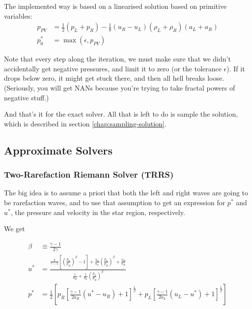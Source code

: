 The implemented way is based on a linearised solution based on primitive variables:
\begin{align*}
	p_{PV} &= \frac{1}{2} (p_L + p_R) - \frac{1}{8} (u_R - u_L)(\rho_L + \rho_R)(a_L + a_R)\\
	p_0^* &= \max(\epsilon, p_{PV})
\end{align*}

Note that every step along the iteration, we must make sure that we didn't accidentally get negative pressures, and limit it to zero (or the tolerance $\epsilon$). 
If it drops below zero, it might get stuck there, and then all hell breaks loose.
(Seriously, you will get NANs because you're trying to take fractal powers of negative stuff.)


And that's it for the exact solver.
All that is left to do is sample the solution, which is described in section \ref{chap:sampling-solution}.






\subsection{Approximate Solvers}



\subsubsection{Two-Rarefaction Riemann Solver (TRRS)}





The big idea is to assume a priori that both the left and right waves are going to be rarefaction waves, and to use that assumption to get an expression for $p^*$ and $u^*$, the pressure and velocity in the star region, respectively.

We get

\begin{align}
	\beta &\equiv 
		\frac{\gamma - 1}{2 \gamma} \\
	u^* &= 
		\frac{
			\frac{2}{\gamma - 1} \left[\left(\frac{p_L}{p_R} \right) ^ \beta - 1\right]+ \frac{u_L}{a_L} \left(\frac{p_L}{p_R} \right) ^ \beta  + \frac{u_R}{a_R}
		}{
			\frac{1}{a_R} + \frac{1}{a_L}\left(\frac{p_L}{p_R} \right) ^ \beta
		} \\
	p^* &=
		\frac{1}{2} \left[
			p_R \left[ \frac{\gamma - 1}{2 a_R} (u^* - u_R) + 1 \right] ^ \frac{1}{\beta} +
			p_L \left[ \frac{\gamma - 1}{2 a_L} (u_L - u^*) + 1 \right] ^ \frac{1}{\beta}
		\right] \label{eq:pstar-trrs}
\end{align}

